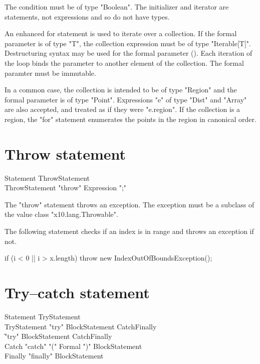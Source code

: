 The condition must be of type \xcd"Boolean".
The initializer and iterator are statements, not expressions
and so do not have types.

\label{ForAllLoop}


An enhanced for statement is used to iterate over a collection.
If the formal parameter is of type \xcd"T",
the collection expression must be of type \xcd"Iterable[T]".
Destructuring
syntax may
be used for the formal parameter ().
Each iteration of the loop
binds the parameter to another element of the collection.
The formal paramter must be immutable. 

In a common case, 
the collection is intended to be of type
\xcd"Region" and the formal parameter is of type \xcd"Point".
Expressions \xcd"e" of type \xcd"Dist" and
\xcd"Array" are also accepted, and treated as if they were
\xcd"e.region".
If the collection is a region, the \xcd"for" statement
enumerates the points in the region in canonical order.



\section{Throw statement}

\begin{grammar}
Statement \: ThrowStatement \\
ThrowStatement \: \xcd"throw" Expression \xcd";"
\end{grammar}

The \xcd"throw" statement throws an exception.  The exception
must be a subclass of the value class \xcd"x10.lang.Throwable". 

\begin{example}
The following statement checks if an index is in range and
throws an exception if not.
\begin{xten}
if (i < 0 || i > x.length)
    throw new IndexOutOfBoundsException();
\end{xten}
\end{example}

\section{Try--catch statement}

\begin{grammar}
Statement \: TryStatement \\
TryStatement \: \xcd"try" BlockStatement Catch\plus Finally\opt \\
             \| \xcd"try" BlockStatement Catch\star Finally \\
Catch \: \xcd"catch" \xcd"(" Formal \xcd")" BlockStatement \\
Finally \: \xcd"finally" BlockStatement \\
\end{grammar}


